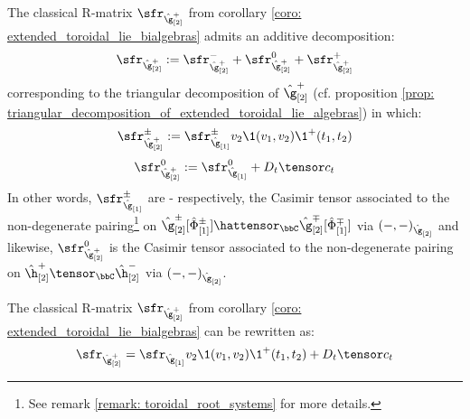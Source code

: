        \begin{theorem}
            The classical R-matrix $\sfr_{ \hat{\g}_{[2]}^+ }$ from corollary \ref{coro: extended_toroidal_lie_bialgebras} admits an additive decomposition:
                $$\sfr_{ \hat{\g}_{[2]}^+ } := \sfr_{ \hat{\g}_{[2]}^+ }^- + \sfr_{ \hat{\g}_{[2]}^+ }^0 + \sfr_{ \hat{\g}_{[2]}^+ }^+$$
            corresponding to the triangular decomposition of $\hat{\g}_{[2]}^+$ (cf. proposition \ref{prop: triangular_decomposition_of_extended_toroidal_lie_algebras}) in which:
                $$\sfr_{ \hat{\g}_{[2]}^+ }^{\pm} := \sfr_{\hat{\g}_{[1]}}^{\pm} v_2 \1(v_1, v_2) \1^+(t_1, t_2)$$
                $$\sfr_{ \hat{\g}_{[2]}^+ }^0 := \sfr_{\hat{\g}_{[1]}}^0 + D_t \tensor c_t$$
            In other words, $\sfr_{\hat{\g}_{[1]}}^{\pm}$ are - respectively, the Casimir tensor associated to the non-degenerate pairing\footnote{See remark \ref{remark: toroidal_root_systems} for more details.} on $\hat{\g}_{[2]}^{\pm}[\hat{\Phi}_{[1]}^{\pm}] \hattensor_{\bbC} \hat{\g}_{[2]}^{\mp}[\hat{\Phi}_{[1]}^{\mp}]$ via $(-, -)_{\hat{\g}_{[2]}}$ and likewise, $\sfr_{ \hat{\g}_{[2]}^+ }^0$ is the Casimir tensor associated to the non-degenerate pairing on $\hat{\h}_{[2]}^+ \tensor_{\bbC} \hat{\h}_{[2]}^-$ via $(-, -)_{\hat{\g}_{[2]}}$. 
        \end{theorem}
        \begin{corollary}
            The classical R-matrix $\sfr_{ \hat{\g}_{[2]}^+ }$ from corollary \ref{coro: extended_toroidal_lie_bialgebras} can be rewritten as:
                $$\sfr_{ \hat{\g}_{[2]}^+ } = \sfr_{\hat{\g}_{[1]}} v_2 \1(v_1, v_2) \1^+(t_1, t_2) + D_t \tensor c_t$$
        \end{corollary}